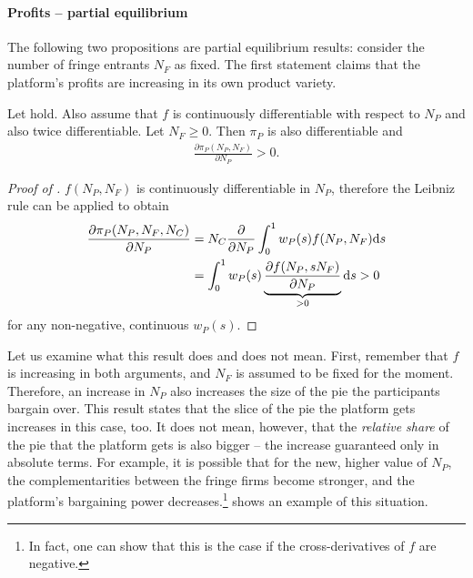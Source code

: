 \paragraph{Profits -- partial equilibrium}
The following two propositions are partial equilibrium results: consider the number of fringe entrants $N_F$ as fixed.
The first statement claims that the platform's profits are increasing in its own product variety.
\begin{proposition}
    \label{prop:share_of_platform}
    Let  hold.
    Also assume that $f$ is continuously differentiable with respect to $N_P$ and also twice differentiable.
    Let $N_F \geq 0$.
    Then $\pi_P$ is also differentiable and
    \begin{align*}
        \frac{\partial \pi_P(N_P, N_F)}{\partial N_P} > 0.
    \end{align*}
\end{proposition}
\begin{proof}[Proof of ]
    $f(N_P, N_F)$ is continuously differentiable in $N_P$, therefore the Leibniz rule can be applied to obtain
    \begin{align*}
        \frac{\partial \pi_P(N_P, N_F, N_C)}{\partial N_P} &= N_C \frac{\partial}{\partial N_P} \int_0^1 w_P(s) f(N_P, N_F) \mathrm{d}s \\
        &= \int_0^1 w_P(s) \underbrace{\frac{\partial f(N_P, sN_F)}{\partial N_P}}_{> 0} \mathrm{d}s > 0
    \end{align*}
    for any non-negative, continuous $w_P(s)$.
\end{proof}
Let us examine what this result does and does not mean.
First, remember that $f$ is increasing in both arguments, and $N_F$ is assumed to be fixed for the moment.
Therefore, an increase in $N_P$ also increases the size of the pie the participants bargain over.
This result states that the slice of the pie the platform gets increases in this case, too.
It does not mean, however, that the \emph{relative share} of the pie that the platform gets is also bigger -- the increase guaranteed only in absolute terms.
For example, it is possible that for the new, higher value of $N_P$, the complementarities between the fringe firms become stronger, and the platform's bargaining power decreases.\footnote{
    In fact, one can show that this is the case if the cross-derivatives of $f$ are negative.
}
 shows an example of this situation.

